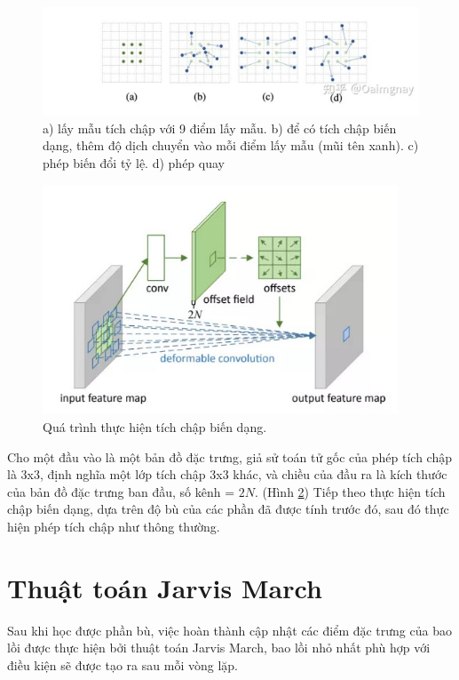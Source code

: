 \documentclass[12pt,a4paper,openany,oneside]{report}
\begin{document}
\begin{figure}[ht!]
	\begin{center}
		\includegraphics[width=445px]{./feature_offset_type.jpg}
		\caption{a) lấy mẫu tích chập với 9 điểm lấy mẫu. b) để có tích chập biến dạng, thêm độ dịch chuyển vào mỗi điểm lấy mẫu (mũi tên xanh). c) phép biến đổi tỷ lệ. d) phép quay
		}
		\label{offset_deformable_convolution}
	\end{center}
\end{figure} 

\begin{figure}[ht!]
	\begin{center}
		\includegraphics[width=400px]{./deformable_process.jpg}
		\caption{Quá trình thực hiện tích chập biến dạng.}
		\label{deformable_process}
	\end{center}
\end{figure} 


Cho một đầu vào là một bản đồ đặc trưng, giả sử toán tử gốc của phép tích chập là 3x3, định nghĩa một lớp tích chập 3x3 khác, và chiều của đầu ra là kích thước của bản đồ đặc trưng ban đầu, số kênh = $2N$. (Hình \ref{deformable_process}) Tiếp theo thực hiện tích chập biến dạng, dựa trên độ bù của các phần đã được tính trước đó, sau đó thực hiện phép tích chập như thông thường.
\section{Thuật toán Jarvis March}
Sau khi học được phần bù, việc hoàn thành cập nhật các điểm đặc trưng của bao lồi được thực hiện bởi thuật toán Jarvis March, bao lồi nhỏ nhất phù hợp với điều kiện sẽ được tạo ra sau mỗi vòng lặp.
\end{document}
